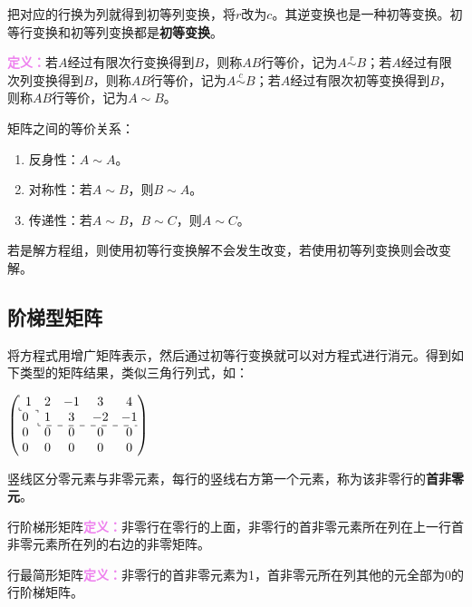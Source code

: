 \documentclass[UTF8, 12pt]{ctexart}
\begin{document}
把对应的行换为列就得到初等列变换，将$r$改为$c$。其逆变换也是一种初等变换。初等行变换和初等列变换都是\textbf{初等变换}。

\textcolor{violet}{\textbf{定义：}}若$A$经过有限次行变换得到$B$，则称$AB$行等价，记为$A\overset{r}{\sim}B$；若$A$经过有限次列变换得到$B$，则称$AB$行等价，记为$A\overset{c}{\sim}B$；若$A$经过有限次初等变换得到$B$，则称$AB$行等价，记为$A\sim B$。

矩阵之间的等价关系：

\begin{enumerate}
    \item 反身性：$A\sim A$。
    \item 对称性：若$A\sim B$，则$B\sim A$。
    \item 传递性：若$A\sim B$，$B\sim C$，则$A\sim C$。
\end{enumerate}

若是解方程组，则使用初等行变换解不会发生改变，若使用初等列变换则会改变解。

\subsection{阶梯型矩阵}

将方程式用增广矩阵表示，然后通过初等行变换就可以对方程式进行消元。得到如下类型的矩阵结果，类似三角行列式，如：

\begin{multicols}{2}
    
    $
    \left(
    \begin{array}{@{} c c c c c @{}}
        \multicolumn{1}{: c}{1} & 2 & -1 &  3 &  4 \\
      \cdashline{1-1}
      0 & \multicolumn{1}{: c}{1} &  3 & -2 & -1 \\
      \cdashline{2-5}
      0 & 0 &  0 &  0 &  0 \\
      0 & 0 &  0 &  0 &  0
    \end{array}
    \right)
    $

    竖线区分零元素与非零元素，每行的竖线右方第一个元素，称为该非零行的\textbf{首非零元}。

\end{multicols}

行阶梯形矩阵\textcolor{violet}{\textbf{定义：}}非零行在零行的上面，非零行的首非零元素所在列在上一行首非零元素所在列的右边的非零矩阵。

行最简形矩阵\textcolor{violet}{\textbf{定义：}}非零行的首非零元素为1，首非零元所在列其他的元全部为0的行阶梯矩阵。
\end{document}
